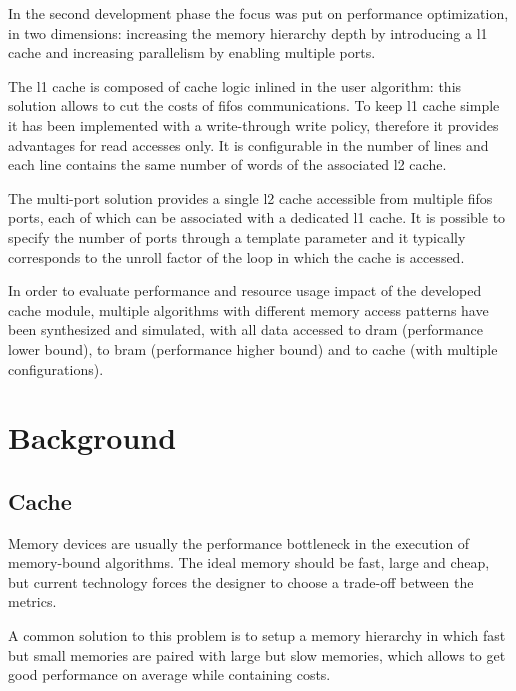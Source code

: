 \documentclass[11pt,a4paper,oneside]{memoir}
\begin{document}
\bigskip
In the second development phase the focus was put on performance optimization,
in two dimensions: increasing the memory hierarchy depth by introducing a
\ac{l1} cache and increasing parallelism by enabling multiple ports.

The \ac{l1} cache is composed of cache logic inlined in the user algorithm: this
solution allows to cut the costs of \acp{fifo} communications. To keep \ac{l1}
cache simple it has been implemented with a write-through write policy,
therefore it provides advantages for read accesses only. It is configurable in
the number of lines and each line contains the same number of words of the
associated \ac{l2} cache.

The multi-port solution provides a single \ac{l2} cache accessible from multiple
\acp{fifo} ports, each of which can be associated with a dedicated \ac{l1}
cache.
It is possible to specify the number of ports through a template parameter and
it typically corresponds to the unroll factor of the loop in which the cache
is accessed.

\bigskip
In order to evaluate performance and resource usage impact of the developed
cache module, multiple algorithms with different memory access patterns have
been synthesized and simulated, with all data accessed to \ac{dram} (performance
lower bound), to \ac{bram} (performance higher bound) and to cache (with
multiple configurations).

\vfill
\pagebreak

\tableofcontents*
\vfill
\pagebreak

\listoffigures
\vfill
\pagebreak

\listoftables
\vfill
\pagebreak

\printacronyms[heading=chapter,name={List of Acronyms}]
\vfill
\pagebreak

\mainmatter
\chapter{Background}
\section{Cache}
Memory devices are usually the performance bottleneck in the execution of
memory-bound algorithms.
The ideal memory should be fast, large and cheap, but current technology forces
the designer to choose a trade-off between the metrics.

A common solution to this problem is to setup a memory hierarchy in
which fast but small memories are paired with large but slow memories, which
allows to get good performance on average while containing costs.
\end{document}
